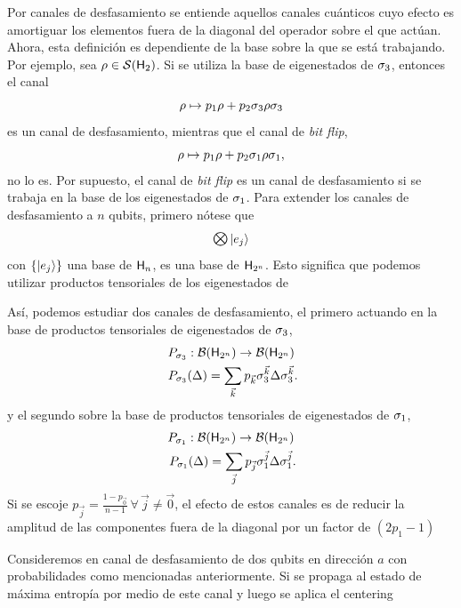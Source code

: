 Por canales de desfasamiento se entiende aquellos canales cuánticos cuyo efecto es amortiguar los elementos fuera de la diagonal del operador sobre el que actúan. Ahora, esta definición es dependiente de la base sobre la que se está trabajando. Por ejemplo, sea $\rho\in\mathcal{S}({\sf H}_{2})$. Si se utiliza la base de eigenestados de $\sigma_{3}$, entonces el canal
\begin{equation}
    \rho\mapsto p_{1}\rho + p_{2} \sigma_{3}\rho\sigma_{3}\nonumber
\end{equation}
es un canal de desfasamiento, mientras que el canal de \textit{bit flip},
\begin{equation}
    \rho\mapsto p_{1}\rho + p_{2} \sigma_{1}\rho\sigma_{1},\nonumber
\end{equation}
no lo es. Por supuesto, el canal de \textit{bit flip} es un canal de desfasamiento si se trabaja en la base de los eigenestados de $\sigma_{1}$. Para extender los canales de desfasamiento a $n$ qubits, primero nótese que
\begin{equation}
    \Motimes \ket{e_{j}}
\end{equation}
con $\{\ket{e_{j}}\}$ una base de ${\sf H}_{n}$, es una base de ${\sf H}_{2^{n}}$. Esto significa que podemos utilizar productos tensoriales de los eigenestados de 


Así, podemos estudiar dos canales de desfasamiento, el primero actuando en la base de productos tensoriales de eigenestados de $\sigma_{3}$,
\begin{gather}
    P_{\pauli{3}}:\mcB(\hilbert_{2^{n}}) \rightarrow \mcB(\hilbert_{2^{n}})\nonumber\\
    P_{\pauli{3}}(\Delta)=\sum_{\vec{k}}p_{\vec{k}}\pauli{3}^{\vec{k}}\Delta\pauli{3}^{\vec{k}}\rlap{.}\nonumber
\end{gather}
y el segundo sobre la base de productos tensoriales de eigenestados de $\sigma_{1}$,
\begin{gather}
    P_{\pauli{1}}:\mcB(\hilbert_{2^{n}}) \rightarrow \mcB(\hilbert_{2^{n}})\nonumber\\
    P_{\pauli{1}}(\Delta)=\sum_{\vec{j}}p_{\vec{j}}\pauli{1}^{\vec{j}}\Delta\pauli{1}^{\vec{j}}\rlap{.}\nonumber
\end{gather}
 Si se escoje $p_{\vec{j}}=\frac{1-p_{\vec{0}}}{n-1}\,\forall\,\vec{j}\neq\vec{0}$, el efecto de estos canales es de reducir la amplitud de las componentes fuera de la diagonal por un factor de $(2p_{1}-1)$

Consideremos en canal de desfasamiento de dos qubits en dirección $a$ con probabilidades como mencionadas anteriormente. Si se propaga al estado de máxima entropía por medio de este canal y luego se aplica el centering


